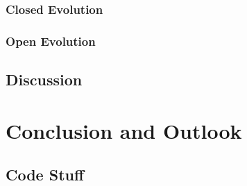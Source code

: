 \documentclass[12pt]{article}
\begin{document}
\subsubsection{Closed Evolution}
\subsubsection{Open Evolution}
\subsection{Discussion}




































\newpage
\section{Conclusion and Outlook} \label{sec:conc}











































\begin{appendices}
    \section{Code Stuff} \label{appendix_code}
\end{appendices}
\newpage

 
 
\end{document}
